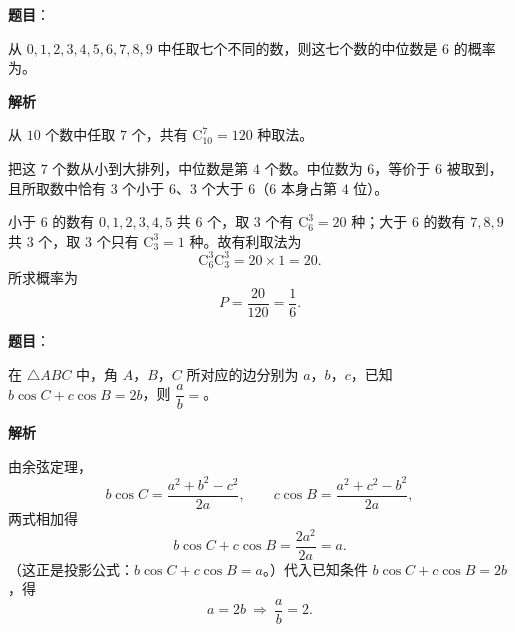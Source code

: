 \begin{answer}

\textbf{题目}：

从 $0,1,2,3,4,5,6,7,8,9$ 中任取七个不同的数，则这七个数的中位数是 $6$ 的概率为\gkblank{}。

\textbf{解析}

从 $10$ 个数中任取 $7$ 个，共有 $\mathrm C_{10}^7=120$ 种取法。

把这 $7$ 个数从小到大排列，中位数是第 $4$ 个数。中位数为 $6$，等价于 $6$ 被取到，且所取数中恰有 $3$ 个小于 $6$、$3$ 个大于 $6$（$6$ 本身占第 $4$ 位）。

小于 $6$ 的数有 $0,1,2,3,4,5$ 共 $6$ 个，取 $3$ 个有 $\mathrm C_6^3=20$ 种；大于 $6$ 的数有 $7,8,9$ 共 $3$ 个，取 $3$ 个只有 $\mathrm C_3^3=1$ 种。故有利取法为
\nopagebreak[4]
\[\mathrm C_6^3\mathrm C_3^3=20\times1=20.\]
所求概率为
\nopagebreak[4]
\[P=\frac{20}{120}=\frac16.\]


\end{answer}
\begin{answer}

\textbf{题目}：

在 $\triangle ABC$ 中，角 $A$，$B$，$C$ 所对应的边分别为 $a$，$b$，$c$，已知 $b\cos C+c\cos B=2b$，则 $\dfrac ab=$\gkblank{}。

\textbf{解析}

由余弦定理，
\nopagebreak[4]
\[b\cos C=\frac{a^2+b^2-c^2}{2a},\qquad c\cos B=\frac{a^2+c^2-b^2}{2a},\]
两式相加得
\nopagebreak[4]
\[b\cos C+c\cos B=\frac{2a^2}{2a}=a.\]
（这正是投影公式：$b\cos C+c\cos B=a$。）代入已知条件 $b\cos C+c\cos B=2b$，得
\nopagebreak[4]
\[a=2b\ \Longrightarrow\ \frac ab=2.\]


\end{answer}
